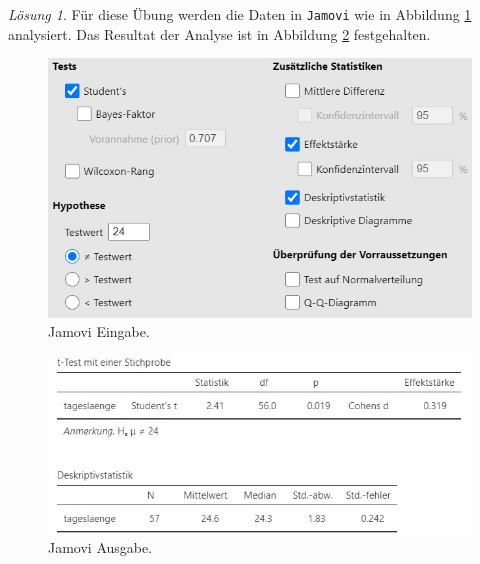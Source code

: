 \documentclass[
]{book}
\theoremstyle{definition}
\theoremstyle{definition}
\theoremstyle{definition}
\theoremstyle{definition}
\theoremstyle{remark}
\newtheorem*{solution}{Lösung}
\begin{document}
\begin{solution}

Für diese Übung werden die Daten in \texttt{Jamovi} wie in Abbildung \ref{fig:sol-circadian-input} analysiert. Das Resultat der Analyse ist in Abbildung \ref{fig:sol-circadian-output} festgehalten.

\begin{figure}

{\centering \includegraphics[width=1\linewidth]{figures/05-exr-circadian-jmv-input} 

}

\caption{Jamovi Eingabe.}\label{fig:sol-circadian-input}
\end{figure}

\begin{figure}

{\centering \includegraphics[width=1\linewidth]{figures/05-exr-circadian-jmv-output} 

}

\caption{Jamovi Ausgabe.}\label{fig:sol-circadian-output}
\end{figure}


\end{solution}
\end{document}
